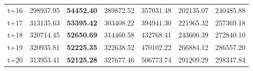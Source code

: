 \begin{table}[H]
\begin{tabular}{lrrrrrr}
t+16  & 298937.95  & \textbf{54452.40}  & 289872.52  & 357031.48  & 202135.07  & 240485.88  \\
t+17  & 313135.63  & \textbf{53395.42}  & 303408.22  & 394941.30  & 221965.32  & 257369.18  \\
t+18  & 320714.45  & \textbf{52650.69}  & 314460.58  & 432768.41  & 243606.39  & 272840.10  \\
t+19  & 320935.81  & \textbf{52225.35}  & 322638.52  & 470102.22  & 266884.12  & 286557.20  \\
t+20  & 313953.41  & \textbf{52125.28}  & 327677.46  & 506773.74  & 291209.29  & 298347.84  \\

\bottomrule
\end{tabular}
\end{table}
